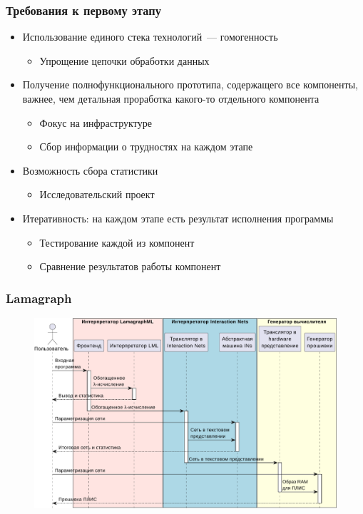 \documentclass[aspectratio=169]{beamer}
\begin{document}
\begin{frame}
    \frametitle{Требования к первому этапу}

    \begin{itemize}
        \item Использование единого стека технологий~--- гомогенность
              \begin{itemize}
                  \item Упрощение цепочки обработки данных
              \end{itemize}
        \item Получение полнофункционального прототипа, содержащего все компоненты, важнее, чем детальная проработка какого-то отдельного компонента
              \begin{itemize}
                  \item Фокус на инфраструктуре
                  \item Сбор информации о трудностях на каждом этапе
              \end{itemize}
        \item Возможность сбора статистики
              \begin{itemize}
                  \item Исследовательский проект
              \end{itemize}
        \item Итеративность: на каждом этапе есть результат исполнения программы
              \begin{itemize}
                  \item Тестирование каждой из компонент
                  \item Сравнение результатов работы компонент
              \end{itemize}
    \end{itemize}

\end{frame}

\begin{frame}
    \frametitle{Lamagraph}

    \begin{figure}
        \includegraphics[width=0.75\linewidth]{pictures/using.pdf}
    \end{figure}

\end{frame}
\end{document}
